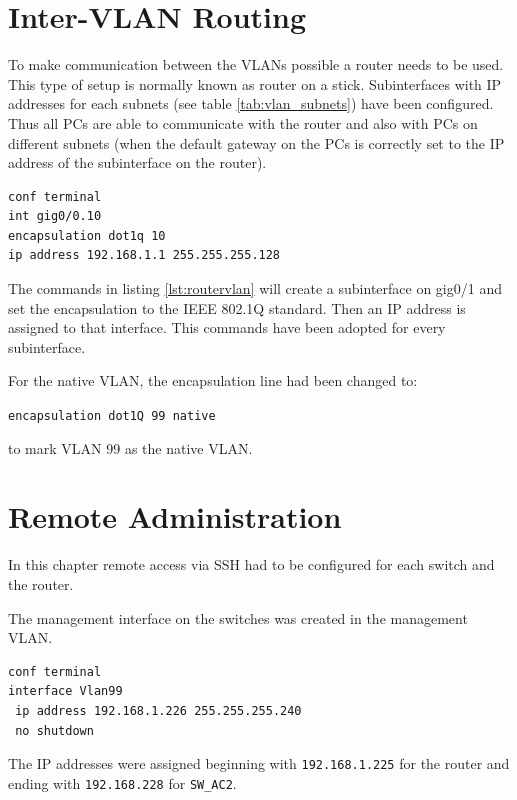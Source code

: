 
\chapter{Inter-VLAN Routing}

To make communication between the VLANs possible a router needs to be used. This type of setup is normally known as router on a stick. Subinterfaces with IP addresses for each subnets (see table \ref{tab:vlan_subnets}) have been configured. Thus all PCs are able to communicate with the router and also with PCs on different subnets (when the default gateway on the PCs is correctly set to the IP address of the subinterface on the router).

\begin{lstlisting}[caption={Router configuration},label={lst:routervlan},language={}]
conf terminal
int gig0/0.10
encapsulation dot1q 10
ip address 192.168.1.1 255.255.255.128
\end{lstlisting}

The commands in listing \ref{lst:routervlan} will create a subinterface on gig0/1 and set the encapsulation to the IEEE 802.1Q standard. Then an IP address is assigned to that interface. This commands have been adopted for every subinterface.

For the native VLAN, the encapsulation line had been changed to:

\texttt{encapsulation dot1Q 99 native}

to mark VLAN 99 as the native VLAN.

\chapter{Remote Administration}

In this chapter remote access via \ac{SSH} had to be configured for each switch and the router.

The management interface on the switches was created in the management \ac{VLAN}.

\begin{lstlisting}[caption={Management interface},label={lst:sw99},language={}]
conf terminal
interface Vlan99
 ip address 192.168.1.226 255.255.255.240
 no shutdown
\end{lstlisting}

The IP addresses were assigned beginning with \texttt{192.168.1.225} for the router and ending with \texttt{192.168.228} for \texttt{SW\_AC2}.

